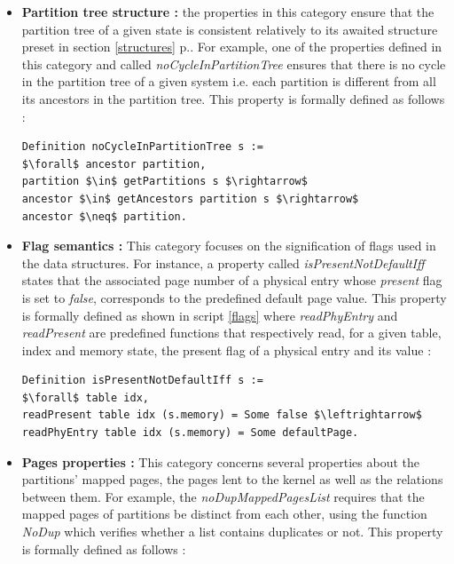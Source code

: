 \begin{itemize}
	\item \textbf{Partition tree structure :} the properties in this category ensure that the partition tree of a given state is consistent relatively to its awaited structure preset in section \ref{structures} p.\pageref{structures}. For example, one of the properties defined in this category and called \textit{noCycleInPartitionTree} ensures that there is no cycle in the partition tree of a given system i.e. each partition is different from all its ancestors in the partition tree. This property is formally defined as follows :
\begin{lstlisting}[caption = {Example of partition-tree-consistency property}, mathescape=true,xleftmargin=.08\textwidth,
xrightmargin=.14\textwidth]
Definition noCycleInPartitionTree s :=
$\forall$ ancestor partition,
partition $\in$ getPartitions s $\rightarrow$
ancestor $\in$ getAncestors partition s $\rightarrow$
ancestor $\neq$ partition.
\end{lstlisting}
	\item \textbf{Flag semantics :} This category focuses on the signification of flags used in the data structures. For instance, a property called \textit{isPresentNotDefaultIff} states that the associated page number of a physical entry whose \textit{present} flag is set to \textit{false}, corresponds to the predefined default page value. This property is formally defined as shown in script \ref{flags} where \textit{readPhyEntry} and \textit{readPresent} are predefined functions that respectively read, for a given table, index and memory state, the present flag of a physical entry and its value  :
\begin{lstlisting}[caption = {Example of a flags-semantics-consistency property}, mathescape=true , label={flags}]
Definition isPresentNotDefaultIff s :=
$\forall$ table idx,
readPresent table idx (s.memory) = Some false $\leftrightarrow$
readPhyEntry table idx (s.memory) = Some defaultPage.
\end{lstlisting}	 
	\item \textbf{Pages properties :} This category concerns several properties about the partitions' mapped pages, the pages lent to the kernel as well as the relations between them. For example, the \textit{noDupMappedPagesList} requires that the mapped pages of partitions be distinct from each other, using the function \textit{NoDup} which verifies whether a list contains duplicates or not. This property is formally defined as follows  :
\begin{lstlisting}[caption = {Example of a pages-consistency property}, mathescape=true,xleftmargin=.07\textwidth,
xrightmargin=.07\textwidth]

\end{lstlisting}
\end{itemize}
